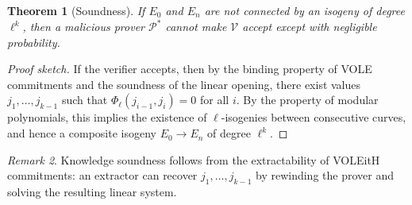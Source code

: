 \documentclass[11pt,a4paper]{article}
\newtheorem{theorem}{Theorem}[section]
\theoremstyle{definition}
\theoremstyle{remark}
\newtheorem{remark}[theorem]{Remark}
\newcommand{\calP}{\mathcal{P}}
\newcommand{\calV}{\mathcal{V}}
\newcommand{\polyrel}{\Phi}
\begin{document}
\begin{theorem}[Soundness]
	If $E_0$ and $E_n$ are not connected by an isogeny of degree $\ell^k$,
	then a malicious prover $\calP^*$ cannot make $\calV$ accept except with
	negligible probability.
\end{theorem}

\begin{proof}[Proof sketch]
	If the verifier accepts, then by the binding property of VOLE
	commitments and the soundness of the linear opening, there exist
	values $j_1, \dots, j_{k-1}$ such that
	$\polyrel_{\ell}(j_{i-1}, j_i) = 0$ for all $i$.
	By the property of modular polynomials, this implies the existence
	of $\ell$-isogenies between consecutive curves, and hence a composite
	isogeny $E_0 \to E_n$ of degree $\ell^k$.
\end{proof}

\begin{remark}
	Knowledge soundness follows from the extractability of VOLEitH
	commitments: an extractor can recover $j_1, \dots, j_{k-1}$ by
	rewinding the prover and solving the resulting linear system.
\end{remark}

\printbibliography
\end{document}
